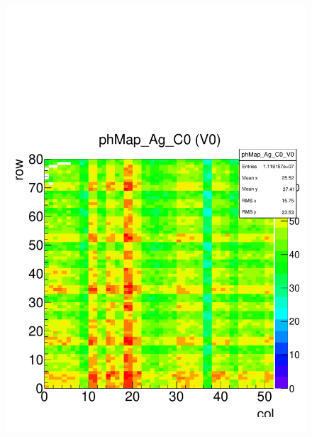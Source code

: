 \documentclass[a4paper,12pt,twoside]{article}
\begin{document}
\begin{figure} [h!]
\centering
\begin{minipage}{.48\textwidth}
  \centering
  \includegraphics[width=\textwidth]{./HRData_PHMap.pdf}
  \label{HRData-PHmap}
\end{minipage}%
\hspace{2mm}
\begin{minipage}{.48\textwidth}
  \centering

\end{minipage}
\end{figure}
\end{document}
